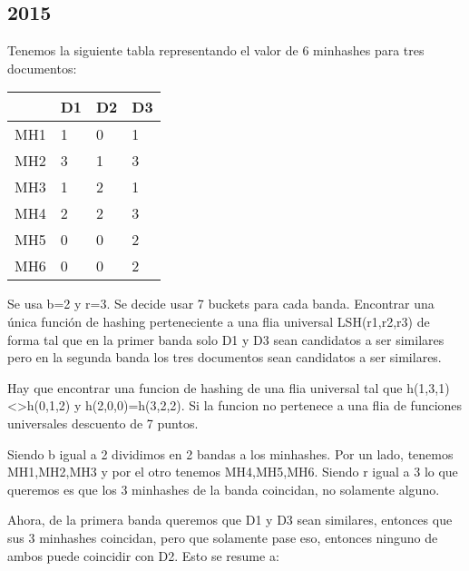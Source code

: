 \documentclass[a4paper]{article}
\newenvironment{enunciado}[3]{%
    \vspace{\baselineskip}
    \tcolorbox[beamer,%
    noparskip,breakable,
    colback=LightGreen,colframe=DarkGreen,%
    colbacklower=LimeGreen!75!LightGreen,%
    title=\small Enunciado: Año #1\, Cuatrimestre #2\, Oportunidad #3]}%
    {\endtcolorbox}
\newenvironment{criterio}[3]{%
    \tcolorbox[beamer,%
    noparskip,breakable,
    colback=LightCoral,colframe=DarkRed,%
    colbacklower=Tomato!75!LightCoral,%
    title=\small Criterio de Corrección: Año #1\, Cuatrimestre #2\, Oportunidad #3]}%
    {\endtcolorbox}
\begin{document}
    \subsection{2015}

    \begin{enunciado}{2015}{2}{1}  
        Tenemos la siguiente tabla representando el valor de 6 minhashes para tres documentos:

        \begin{table}[H]
            \begin{tabular}{llll}
                \hline
                & D1 & D2 & D3 \\
                \hline
            MH1 & 1  & 0  & 1  \\
            MH2 & 3  & 1  & 3  \\
            MH3 & 1  & 2  & 1  \\
            MH4 & 2  & 2  & 3  \\
            MH5 & 0  & 0  & 2  \\
            MH6 & 0  & 0  & 2  \\
                \hline
            \end{tabular}
        \end{table}

        Se usa  b=2 y r=3. Se decide usar 7 buckets para cada banda. Encontrar una  única  función   de   hashing   perteneciente   a   una   flia   universal LSH(r1,r2,r3) de forma tal que en la primer banda solo D1 y D3 sean candidatos   a   ser   similares   pero   en   la   segunda   banda   los   tres documentos sean candidatos a ser similares.
    \end{enunciado}

    \begin{criterio}{2015}{2}{1}
        Hay que encontrar una funcion de hashing de una flia universal tal que h(1,3,1)<>h(0,1,2) y h(2,0,0)=h(3,2,2). Si la funcion no pertenece a una flia de funciones universales descuento de 7 puntos.
    \end{criterio}

    Siendo b igual a 2 dividimos en 2 bandas a los minhashes. Por un lado, tenemos MH1,MH2,MH3 y por el otro tenemos MH4,MH5,MH6. Siendo r igual a 3 lo que queremos es que los 3 minhashes de la banda coincidan, no solamente alguno.
    
    Ahora, de la primera banda queremos que D1 y D3 sean similares, entonces que sus 3 minhashes coincidan, pero que solamente pase eso, entonces ninguno de ambos puede coincidir con D2. Esto se resume a:
\end{document}
